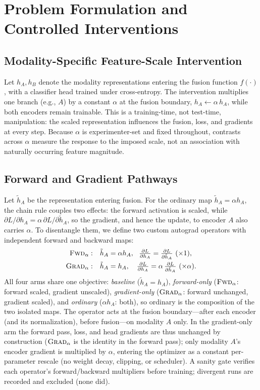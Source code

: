 \documentclass[conference]{IEEEtran}
\begin{document}
\section{Problem Formulation and Controlled Interventions}
\label{sec:formulation}
\subsection{Modality-Specific Feature-Scale Intervention}
Let $h_A,h_B$ denote the modality representations entering the fusion function $f(\cdot)$, with a classifier head trained under cross-entropy. The intervention multiplies one branch (e.g., $A$) by a constant $\alpha$ at the fusion boundary, $h_A \leftarrow \alpha\,h_A$, while both encoders remain trainable. This is a training-time, not test-time, manipulation: the scaled representation influences the fusion, loss, and gradients at every step. Because $\alpha$ is experimenter-set and fixed throughout, contrasts across $\alpha$ measure the response to the imposed scale, not an association with naturally occurring feature magnitude.

\subsection{Forward and Gradient Pathways}
Let $\tilde h_A$ be the representation entering fusion. For the ordinary map $\tilde h_A=\alpha h_A$, the chain rule couples two effects: the forward activation is scaled, while $\partial L/\partial h_A=\alpha\,\partial L/\partial\tilde h_A$, so the gradient, and hence the update, to encoder $A$ also carries $\alpha$. To disentangle them, we define two custom autograd operators with independent forward and backward maps:
\begin{align}
\textsc{Fwd}_\alpha:&\quad \tilde h_A=\alpha h_A,\ \ \tfrac{\partial L}{\partial h_A}=\tfrac{\partial L}{\partial \tilde h_A}\ (\times 1),\\
\textsc{Grad}_\alpha:&\quad \tilde h_A=h_A,\ \ \ \tfrac{\partial L}{\partial h_A}=\alpha\,\tfrac{\partial L}{\partial \tilde h_A}\ (\times \alpha).
\end{align}
All four arms share one objective: \emph{baseline} ($\tilde h_A=h_A$), \emph{forward-only} ($\textsc{Fwd}_\alpha$: forward scaled, gradient unscaled), \emph{gradient-only} ($\textsc{Grad}_\alpha$: forward unchanged, gradient scaled), and \emph{ordinary} ($\alpha h_A$: both), so ordinary is the composition of the two isolated maps. The operator acts at the fusion boundary---after each encoder (and its normalization), before fusion---on modality $A$ only. In the gradient-only arm the forward pass, loss, and head gradients are thus unchanged by construction ($\textsc{Grad}_\alpha$ is the identity in the forward pass); only modality $A$'s encoder gradient is multiplied by $\alpha$, entering the optimizer as a constant per-parameter rescale (no weight decay, clipping, or scheduler). A sanity gate verifies each operator's forward/backward multipliers before training; divergent runs are recorded and excluded (none did).
\end{document}

